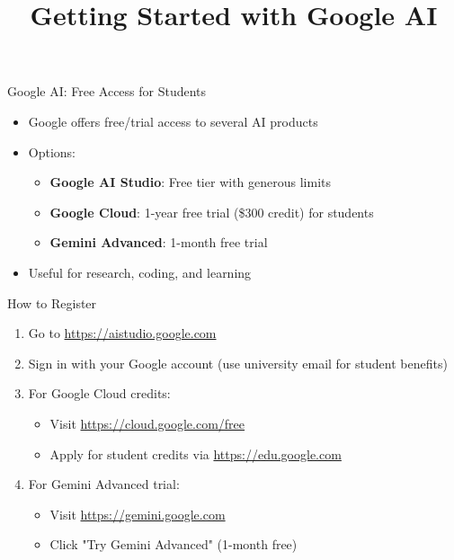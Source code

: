 \documentclass{beamer}
\title{Getting Started with Google AI}
\begin{document}
\begin{frame}
\titlepage
\end{frame}

\begin{frame}{Google AI: Free Access for Students}
\begin{itemize}
    \item Google offers free/trial access to several AI products
    \item Options:
    \begin{itemize}
        \item \textbf{Google AI Studio}: Free tier with generous limits
        \item \textbf{Google Cloud}: 1-year free trial (\$300 credit) for students
        \item \textbf{Gemini Advanced}: 1-month free trial
    \end{itemize}
    \item Useful for research, coding, and learning
\end{itemize}
\end{frame}

\begin{frame}{How to Register}
\begin{enumerate}
    \item Go to \url{https://aistudio.google.com}
    \item Sign in with your Google account (use university email for student benefits)
    \item For Google Cloud credits:
    \begin{itemize}
        \item Visit \url{https://cloud.google.com/free}
        \item Apply for student credits via \url{https://edu.google.com}
    \end{itemize}
    \item For Gemini Advanced trial:
    \begin{itemize}
        \item Visit \url{https://gemini.google.com}
        \item Click "Try Gemini Advanced" (1-month free)
    \end{itemize}
\end{enumerate}
\end{frame}
\end{document}
